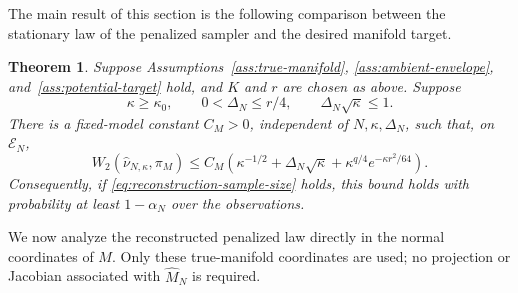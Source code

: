 \documentclass{article}
\newtheorem{theorem}{Theorem}
\newcommand{\cE}{\mathcal E}
\newcommand{\wideM}{\widehat M_N}
\newcommand{\whatnu}{\widehat\nu_{N,\kappa}}
\numberwithin{equation}{section}
\begin{document}
The main result of this section is the following comparison between the
stationary law of the penalized sampler and the desired manifold target.
\begin{theorem}
\label{thm:main-w2}
Suppose Assumptions~\ref{ass:true-manifold},
\ref{ass:ambient-envelope}, and~\ref{ass:potential-target} hold, and $K$
and $r$ are chosen as above. Suppose
\[
 \kappa\ge\kappa_0,
 \qquad 0<\Delta_N\le r/4,
 \qquad \Delta_N\sqrt\kappa\le1.
\]
There is a fixed-model constant $C_M>0$, independent of
$N,\kappa,\Delta_N$, such that, on $\cE_N$,
\begin{equation}
 W_2(\whatnu,\pi_M)
 \le C_M\left(
 \kappa^{-1/2}+\Delta_N\sqrt\kappa
 +\kappa^{q/4}e^{-\kappa r^2/64}
 \right).
\label{eq:main-w2-bound}
\end{equation}
Consequently, if \eqref{eq:reconstruction-sample-size} holds, this bound
holds with probability at least $1-\alpha_N$ over the observations.
\end{theorem}


We now analyze the reconstructed penalized law directly in the normal
coordinates of $M$. Only these true-manifold coordinates are used; no
projection or Jacobian associated with $\wideM$ is required.
\end{document}
